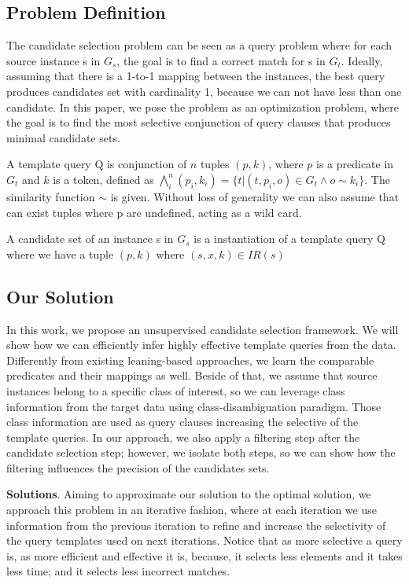 \subsection{Problem Definition} 
The candidate selection problem can be seen as a query problem where for each source instance s in $G_s$, the goal is to find a correct match for s in $G_t$.  Ideally, assuming that there is a 1-to-1 mapping between the instances, the best query produces candidates set with cardinality 1, because we can not have less than one candidate. In this paper, we pose the problem as an optimization problem, where the goal is to find the most selective conjunction of query clauses that produces minimal candidate sets.

\begin{definition}   A template query Q is conjunction of $n$ tuples $(p, k)$, where $p$ is a predicate in $G_t$ and $k$ is a token, defined as $ \bigwedge_{i}^n (p_i, k_i)=\{t | (t,p_i,o) \in G_t  \land o \sim k_i  \}$. The similarity function $\sim$ is given. Without loss of generality we can also assume that can exist tuples where p are undefined, acting as a wild card. 
\end{definition} 
 
\begin{definition}   A candidate set of an instance s in $G_s$ is a instantiation of a template query Q where we have a tuple $(p,k)$ where $(s,x,k) \in IR(s)$
\end{definition} 

\subsection{Our Solution}
In this work, we propose an unsupervised candidate selection framework. We will show how we can efficiently infer highly effective template queries from the data. Differently from existing leaning-based approaches, we learn the comparable predicates and their mappings as well. Beside of that, we assume that source instances belong to a specific class of interest, so we can leverage class information from the target data using class-disambiguation paradigm. Those class information are used as query clauses increasing the selective of the template queries. In our approach, we also apply a filtering step after the candidate selection step; however, we isolate both steps, so we can show how the filtering influences the precision of the candidates sets.
  
\textbf{Solutions}. Aiming to approximate our solution to the optimal solution, we approach this problem in an iterative fashion, where at each iteration we use information from the previous iteration to refine and increase the selectivity of the query templates used on next iterations. Notice that as more selective a query is, as more efficient and effective it is, because, it selects less elements and it takes less time; and it selects less incorrect matches.  

